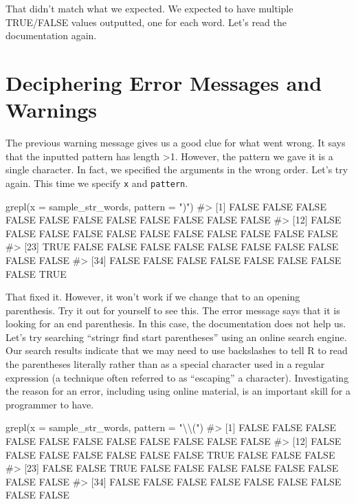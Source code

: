 \documentclass[
  letterpaper,
]{latex/krantz}
\makeatletter
\newenvironment{Shaded}{\begin{snugshade}}{\end{snugshade}}
\newcommand{\AttributeTok}[1]{\textcolor[rgb]{0.40,0.45,0.13}{#1}}
\newcommand{\CommentTok}[1]{\textcolor[rgb]{0.37,0.37,0.37}{#1}}
\newcommand{\FunctionTok}[1]{\textcolor[rgb]{0.28,0.35,0.67}{#1}}
\newcommand{\NormalTok}[1]{\textcolor[rgb]{0.00,0.23,0.31}{#1}}
\newcommand{\SpecialCharTok}[1]{\textcolor[rgb]{0.37,0.37,0.37}{#1}}
\newcommand{\StringTok}[1]{\textcolor[rgb]{0.13,0.47,0.30}{#1}}
\newenvironment{kframe}{%
\medskip{}
\setlength{\fboxsep}{.8em}
 \def\at@end@of@kframe{}%
 \ifinner\ifhmode%
  \def\at@end@of@kframe{\end{minipage}}%
  \begin{minipage}{\columnwidth}%
 \fi\fi%
 \def\FrameCommand##1{\hskip\@totalleftmargin \hskip-\fboxsep
 \colorbox{shadecolor}{##1}\hskip-\fboxsep
     \hskip-\linewidth \hskip-\@totalleftmargin \hskip\columnwidth}%
 \MakeFramed {\advance\hsize-\width
   \@totalleftmargin\z@ \linewidth\hsize
   \@setminipage}}%
 {\par\unskip\endMakeFramed%
 \at@end@of@kframe}
\renewenvironment{Shaded}{\begin{kframe}}{\end{kframe}}
\makeatother
\begin{document}
That didn't match what we expected. We expected to have multiple
TRUE/FALSE values outputted, one for each word. Let's read the
documentation again.

\section{\texorpdfstring{Deciphering Error Messages and Warnings
}{Deciphering Error Messages and Warnings  }}\label{deciphering-error-messages-and-warnings}

The previous warning message gives us a good clue for what went wrong.
It says that the inputted pattern has length \textgreater1. However, the
pattern we gave it is a single character. In fact, we specified the
arguments in the wrong order. Let's try again. This time we specify
\texttt{x} and \texttt{pattern}.

\begin{Shaded}
\begin{Highlighting}[]
\FunctionTok{grepl}\NormalTok{(}\AttributeTok{x =}\NormalTok{ sample\_str\_words, }\AttributeTok{pattern =} \StringTok{")"}\NormalTok{)}
\CommentTok{\#\textgreater{}  [1] FALSE FALSE FALSE FALSE FALSE FALSE FALSE FALSE FALSE FALSE FALSE}
\CommentTok{\#\textgreater{} [12] FALSE FALSE FALSE FALSE FALSE FALSE FALSE FALSE FALSE FALSE FALSE}
\CommentTok{\#\textgreater{} [23]  TRUE FALSE FALSE FALSE FALSE FALSE FALSE FALSE FALSE FALSE FALSE}
\CommentTok{\#\textgreater{} [34] FALSE FALSE FALSE FALSE FALSE FALSE FALSE FALSE  TRUE}
\end{Highlighting}
\end{Shaded}

That fixed it. However, it won't work if we change that to an opening
parenthesis. Try it out for yourself to see this. The error message says
that it is looking for an end parenthesis. In this case, the
documentation does not help us. Let's try searching ``stringr find start
parentheses'' using an online search engine. Our search results indicate
that we may need to use backslashes to tell R to read the parentheses
literally rather than as a special character used in a regular
expression (a technique often referred to as ``escaping'' a character).
Investigating the reason for an error, including using online material,
is an important skill for a programmer to have.

\begin{Shaded}
\begin{Highlighting}[]
\FunctionTok{grepl}\NormalTok{(}\AttributeTok{x =}\NormalTok{ sample\_str\_words, }\AttributeTok{pattern =} \StringTok{"}\SpecialCharTok{\textbackslash{}\textbackslash{}}\StringTok{("}\NormalTok{)}
\CommentTok{\#\textgreater{}  [1] FALSE FALSE FALSE FALSE FALSE FALSE FALSE FALSE FALSE FALSE FALSE}
\CommentTok{\#\textgreater{} [12] FALSE FALSE FALSE FALSE FALSE FALSE FALSE  TRUE FALSE FALSE FALSE}
\CommentTok{\#\textgreater{} [23] FALSE FALSE  TRUE FALSE FALSE FALSE FALSE FALSE FALSE FALSE FALSE}
\CommentTok{\#\textgreater{} [34] FALSE FALSE FALSE FALSE FALSE FALSE FALSE FALSE FALSE}
\end{Highlighting}
\end{Shaded}
\end{document}
